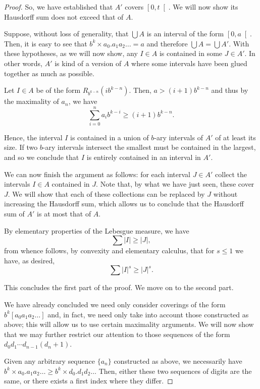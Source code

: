 \documentclass[11pt, reqno]{amsart}
\begin{document}
\begin{proof}
So, we have established that $A'$ covers $\left[0, t\right[$. We will now show its Hausdorff sum does not exceed that of $A$.

Suppose, without loss of generality, that $\bigcup A$ is an interval of the form $\left[0,a\right[$. Then, it is easy to see that $b^k \times a_0 . a_1 a_2 \dots = a$ and therefore $\bigcup A = \bigcup A'$. With these hypotheses, as we will now show, any $I \in A$ is contained in some $J \in A'$. In other words, $A'$ is kind of a version of $A$ where some intervals have been glued together as much as possible.

Let $I \in A$ be of the form $R_{b^{k-n}}(i b^{k-n})$. Then, $a > (i+1) b^{k-n}$ and thus by the maximality of $a_n$, we have
\[ \sum_{i = 0}^n a_i b^{k-i} \geq (i+1) b^{k-n}. \]

Hence, the interval $I$ is contained in a union of $b$-ary intervals of $A'$ of at least its size. If two $b$-ary intervals intersect the smallest must be contained in the largest, and so we conclude that $I$ is entirely contained in an interval in $A'$.

We can now finish the argument as follows: for each interval $J \in A'$ collect the intervals $I \in A$ contained in $J$. Note that, by what we have just seen, these cover $J$. We will show that each of these collections can be replaced by $J$ without increasing the Hausdorff sum, which allows us to conclude that the Hausdorff sum of $A'$ is at most that of $A$.

By elementary properties of the Lebesgue measure, we have
\[ \sum \lvert I \rvert \geq \lvert J \rvert,\]
from whence follows, by convexity and elementary calculus, that for $s \leq 1$ we have, as desired,
\[ \sum \lvert I \rvert^s \geq \lvert J \rvert^s.\]

This concludes the first part of the proof. We move on to the second part.

We have already concluded we need only consider coverings of the form $b^k [a_0 a_1 a_2 \dots]$ and, in fact, we need only take into account those constructed as above; this will allow us to use certain maximality arguments. We will now show that we may further restrict our attention to those sequences of the form $d_0 d_1 \cdots d_{n-1} (d_n + 1)$.

Given any arbitrary sequence $\{a_n\}$ constructed as above, we necessarily have $b^k \times a_0 . a_1 a_2 \ldots \geq b^k \times d_0 . d_1 d_2 \dots$ Then, either these two sequences of digits are the same, or there exists a first index  where they differ.



\end{proof}
\end{document}
